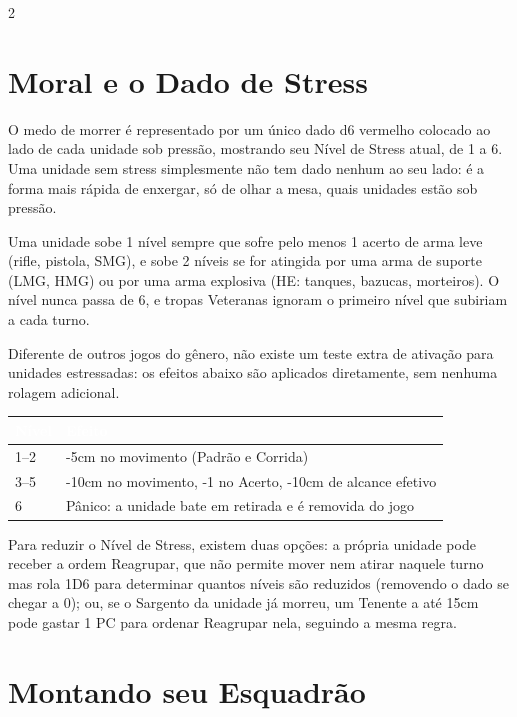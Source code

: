 \documentclass[10pt]{article}
\begin{document}
\begin{multicols}{2}
\section{Moral e o Dado de Stress}

O medo de morrer é representado por um único dado d6 vermelho colocado ao lado de cada unidade sob pressão, mostrando seu Nível de Stress atual, de 1 a 6. Uma unidade sem stress simplesmente não tem dado nenhum ao seu lado: é a forma mais rápida de enxergar, só de olhar a mesa, quais unidades estão sob pressão.

Uma unidade sobe 1 nível sempre que sofre pelo menos 1 acerto de arma leve (rifle, pistola, SMG), e sobe 2 níveis se for atingida por uma arma de suporte (LMG, HMG) ou por uma arma explosiva (HE: tanques, bazucas, morteiros). O nível nunca passa de 6, e tropas Veteranas ignoram o primeiro nível que subiriam a cada turno.

Diferente de outros jogos do gênero, não existe um teste extra de ativação para unidades estressadas: os efeitos abaixo são aplicados diretamente, sem nenhuma rolagem adicional.

\begin{center}
\footnotesize
\setlength{\tabcolsep}{3pt}
\begin{tabular}{@{}lp{4.4cm}@{}}
\toprule
\rowcolor{vinho}
\textcolor{white}{\textbf{Nível}} & \textcolor{white}{\textbf{Efeito}} \\
\midrule
1--2 & -5cm no movimento (Padrão e Corrida) \\
3--5 & -10cm no movimento, -1 no Acerto, -10cm de alcance efetivo \\
6 & Pânico: a unidade bate em retirada e é removida do jogo \\
\bottomrule
\end{tabular}
\end{center}

Para reduzir o Nível de Stress, existem duas opções: a própria unidade pode receber a ordem Reagrupar, que não permite mover nem atirar naquele turno mas rola 1D6 para determinar quantos níveis são reduzidos (removendo o dado se chegar a 0); ou, se o Sargento da unidade já morreu, um Tenente a até 15cm pode gastar 1 PC para ordenar Reagrupar nela, seguindo a mesma regra.

\section{Montando seu Esquadrão}


\end{multicols}
\end{document}

